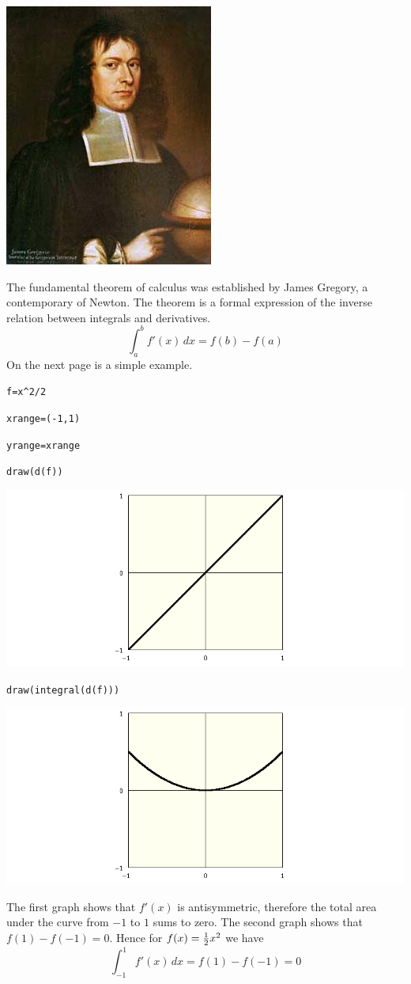 \newpage

\begin{center}
\includegraphics[scale=0.5]{JamesGregory.jpeg}
\end{center}

\bigskip

\noindent
The fundamental theorem of calculus was established by James Gregory,
a contemporary of Newton.
The theorem is a formal expression of the inverse relation between
integrals and derivatives.
$$\int_a^b f'(x)\,dx=f(b)-f(a)$$
On the next page is a simple example.

\newpage

\verb$f=x^2/2$

\verb$xrange=(-1,1)$

\verb$yrange=xrange$

\verb$draw(d(f))$

\noindent
\includegraphics[scale=0.5]{funda1.png}

\verb$draw(integral(d(f)))$

\medskip
\noindent
\includegraphics[scale=0.5]{funda2.png}

\medskip
\noindent
The first graph shows that $f'(x)$ is antisymmetric, therefore the total
area under the curve from $-1$ to $1$ sums to zero.
The second graph shows that $f(1)-f(-1)=0$.
Hence for $f(x)={1\over2}x^2$ we have
$$\int_{-1}^1f'(x)\,dx=f(1)-f(-1)=0$$


